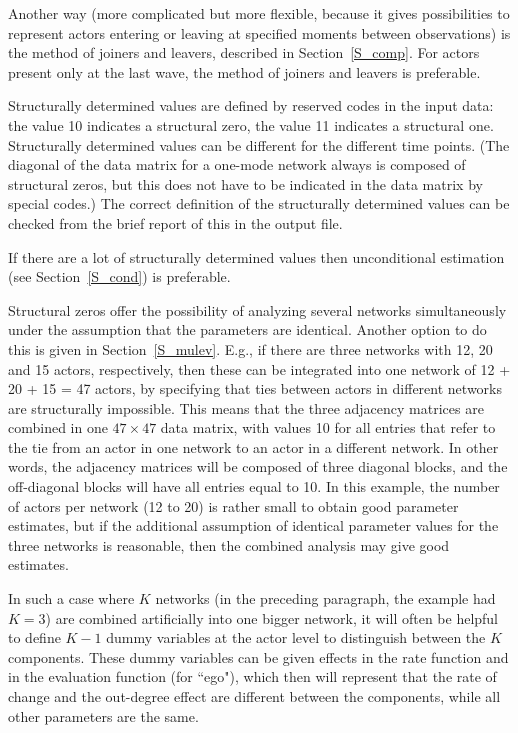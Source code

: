 \documentclass[a4paper,fleqn,11pt]{article}
\newcommand{\+}{\, + \,}
\begin{document}
{Another way (more complicated but more flexible,
because it gives possibilities to represent actors
entering or leaving at specified moments between observations)
is the method of joiners and leavers, described in Section~\ref{S_comp}.
For actors present only at the last wave, the method of
joiners and leavers is preferable.

Structurally determined values are defined by reserved codes in
the input data: the value 10 indicates a structural zero, the
value 11 indicates a structural one. Structurally determined
values can be different for the different time points. (The
diagonal of the data matrix for a one-mode network
always is composed of structural
zeros, but this does not have to be indicated in the data matrix
by special codes.) The correct definition of the structurally
determined values can be checked from the brief report of this in
the output file.

If there are a lot of structurally determined values
then unconditional estimation  (see Section~\ref{S_cond})
is preferable.

Structural zeros offer the possibility of analyzing several
networks simultaneously under the assumption that the parameters
are identical.
Another option to do this is given in Section~\ref{S_mulev}.
E.g., if there are three networks with 12, 20 and
15 actors, respectively, then these can be integrated into one
network of 12 + 20 + 15 = 47 actors, by specifying that ties
between actors in different networks are structurally impossible.
This means that the three adjacency matrices are combined in one
$47 \times 47$ data matrix, with values 10 for all entries that
refer to the tie from an actor in one network to an actor in a
different network. In other words, the adjacency matrices will be
composed of three diagonal blocks, and the off-diagonal blocks
will have all entries equal to 10. In this example, the number of
actors per network (12 to 20) is rather small to obtain good
parameter estimates, but if the additional assumption of identical
parameter values for the three networks is reasonable, then the
combined analysis may give good estimates.

In such a case where $K$ networks (in the preceding paragraph, the
example had $K = 3$) are combined artificially into one bigger
network, it will often be helpful to define $K-1$ dummy variables
at the actor level to distinguish between the $K$ components.
These dummy variables can be given effects in the rate function
and in the evaluation function (for ``ego"), which then will
represent that the rate of change and the out-degree effect are
different between the components, while all other parameters are
the same.

}
\end{document}
